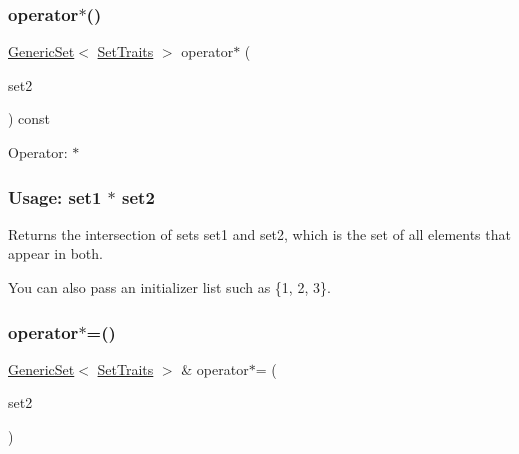 \subsubsection{\texorpdfstring{operator$\ast$()}{operator*()}}
{\footnotesize\ttfamily \mbox{\hyperlink{classstanfordcpplib_1_1collections_1_1GenericSet}{Generic\+Set}}$<$ \mbox{\hyperlink{structstanfordcpplib_1_1collections_1_1SetTraits}{Set\+Traits}} $>$ operator$\ast$ (\begin{DoxyParamCaption}\item[{const \mbox{\hyperlink{classstanfordcpplib_1_1collections_1_1GenericSet}{Generic\+Set}}$<$ \mbox{\hyperlink{structstanfordcpplib_1_1collections_1_1SetTraits}{Set\+Traits}} $>$ \&}]{set2 }\end{DoxyParamCaption}) const}



Operator\+: $\ast$ \subsubsection*{Usage\+: set1 $\ast$ set2 }

Returns the intersection of sets {\ttfamily set1} and {\ttfamily set2}, which is the set of all elements that appear in both. 

You can also pass an initializer list such as \{1, 2, 3\}. \mbox{\label{classstanfordcpplib_1_1collections_1_1GenericSet_a1528986f737cd2163e1361e0bf326957}} 
\subsubsection{\texorpdfstring{operator$\ast$=()}{operator*=()}}
{\footnotesize\ttfamily \mbox{\hyperlink{classstanfordcpplib_1_1collections_1_1GenericSet}{Generic\+Set}}$<$ \mbox{\hyperlink{structstanfordcpplib_1_1collections_1_1SetTraits}{Set\+Traits}} $>$ \& operator$\ast$= (\begin{DoxyParamCaption}\item[{const \mbox{\hyperlink{classstanfordcpplib_1_1collections_1_1GenericSet}{Generic\+Set}}$<$ \mbox{\hyperlink{structstanfordcpplib_1_1collections_1_1SetTraits}{Set\+Traits}} $>$ \&}]{set2 }\end{DoxyParamCaption})}



